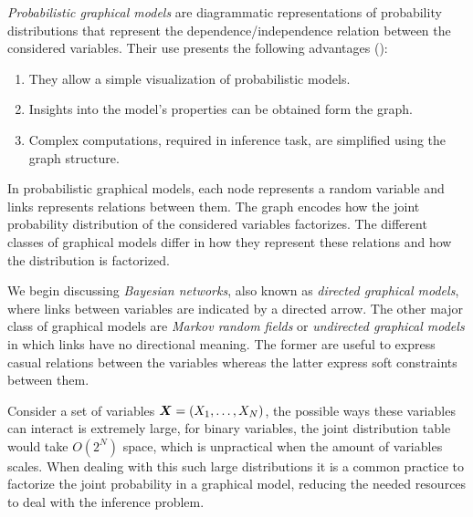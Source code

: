 
\emph{Probabilistic graphical models} are diagrammatic representations of probability distributions that represent the dependence/independence relation between the considered variables. Their use presents the following advantages (\cite{bishop2006pattern}):
\begin{enumerate}\setlength{\itemsep}{0.2cm}
  \item They allow a simple visualization of probabilistic models.
  \item Insights into the model's properties can be obtained form the graph.
  \item Complex computations, required in inference task, are simplified using the graph structure.
\end{enumerate}

In probabilistic graphical models, each node represents a random variable and links represents relations between them. The graph encodes how the joint probability distribution of the considered variables factorizes. The different classes of graphical models differ in how they represent these relations and how the distribution is factorized.

We begin discussing \emph{Bayesian networks}, also known as \emph{directed graphical models}, where links between variables are indicated by a directed arrow.  The other major class of graphical models are \emph{Markov random fields} or \emph{undirected graphical models} in which links have no directional meaning. The former are useful to express casual relations between the variables whereas the latter express soft constraints between them.

Consider a set of variables \(\bm{X} = (X_{1},\dots, X_{N})\), the possible ways these variables can interact is extremely large, for binary variables, the joint distribution table would take \(O(2^{N})\) space, which is unpractical when the amount of variables scales. When dealing with this such large distributions it is a common practice to factorize the joint probability in a graphical model, reducing the needed resources to deal with the inference problem.
